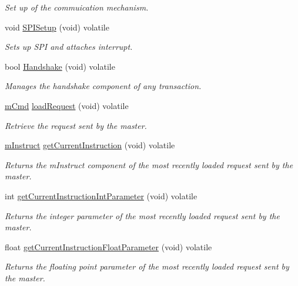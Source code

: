 \begin{DoxyCompactItemize}
\begin{DoxyCompactList}\small\item\em Set up of the commuication mechanism. \end{DoxyCompactList}\item 
void \mbox{\hyperlink{class_master_a23aca637cd51c40ae469a9ee48725edf}{S\+P\+I\+Setup}} (void) volatile
\begin{DoxyCompactList}\small\item\em Sets up S\+PI and attaches interrupt. \end{DoxyCompactList}\item 
bool \mbox{\hyperlink{class_master_a2bc479ad10a53f31c4833668cc9cfac4}{Handshake}} (void) volatile
\begin{DoxyCompactList}\small\item\em Manages the handshake component of any transaction. \end{DoxyCompactList}\item 
\mbox{\hyperlink{structm_cmd}{m\+Cmd}} \mbox{\hyperlink{class_master_a3a3fce38be9020bb12ab595c4adc59ed}{load\+Request}} (void) volatile
\begin{DoxyCompactList}\small\item\em Retrieve the request sent by the master. \end{DoxyCompactList}\item 
\mbox{\hyperlink{_s_p_i___instruction_set_8h_afefab269eb3692ecb3e5fcdbb9440792}{m\+Instruct}} \mbox{\hyperlink{class_master_af892816882821b107d888f3fe3d7dddd}{get\+Current\+Instruction}} (void) volatile
\begin{DoxyCompactList}\small\item\em Returns the m\+Instruct component of the most recently loaded request sent by the master. \end{DoxyCompactList}\item 
int \mbox{\hyperlink{class_master_a918b5964fa7cfc2ef6cf54960a80ced5}{get\+Current\+Instruction\+Int\+Parameter}} (void) volatile
\begin{DoxyCompactList}\small\item\em Returns the integer parameter of the most recently loaded request sent by the master. \end{DoxyCompactList}\item 
float \mbox{\hyperlink{class_master_a32c23c46b93673a8817bf54cf4a52372}{get\+Current\+Instruction\+Float\+Parameter}} (void) volatile
\begin{DoxyCompactList}\small\item\em Returns the floating point parameter of the most recently loaded request sent by the master. \end{DoxyCompactList}\item 

\end{DoxyCompactItemize}

